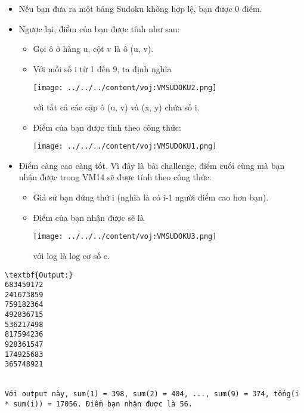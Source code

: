 \begin{itemize}
	\item Nếu bạn đưa ra một bảng Sudoku không hợp lệ, bạn được 0 điểm.
	\item Ngược lại, điểm của bạn được tính như sau:
\begin{itemize}
	\item Gọi ô ở hàng u, cột v là ô (u, v).
	\item Với mỗi số i từ 1 đến 9, ta định nghĩa



\texttt{[image: ../../../content/voj:VMSUDOKU2.png]}


với tất cả các cặp ô (u, v) và (x, y) chứa số i.
	\item Điểm của bạn được tính theo công thức:



\texttt{[image: ../../../content/voj:VMSUDOKU1.png]}
\end{itemize}
	\item Điểm càng cao càng tốt. Vì đây là bài challenge, điểm cuối cùng mà bạn nhận được trong VM14 sẽ được tính theo công thức:
\begin{itemize}
	\item Giả sử bạn đứng thứ i (nghĩa là có i-1 người điểm cao hơn bạn).
	\item Điểm của bạn nhận được sẽ là



\texttt{[image: ../../../content/voj:VMSUDOKU3.png]}


với log là log cơ số e.
\end{itemize}
\end{itemize}
\begin{verbatim}
\textbf{Output:}
683459172
241673859
759182364
492836715
536217498
817594236
928361547
174925683
365748921


Với output này, sum(1) = 398, sum(2) = 404, ..., sum(9) = 374, tổng(i * sum(i)) = 17056. Điểm bạn nhận được là 56.
\end{verbatim}